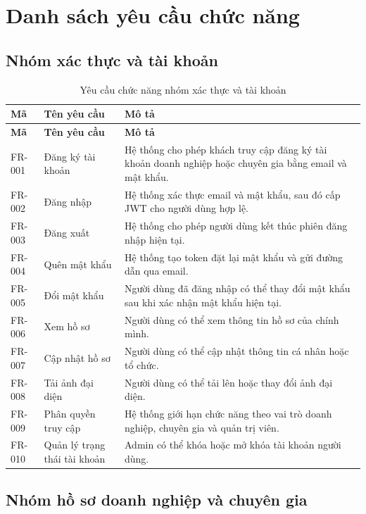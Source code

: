 \section{Danh sách yêu cầu chức năng}
\label{sec:functional-requirements-list}

\subsection{Nhóm xác thực và tài khoản}

\begin{longtable}{|p{2.0cm}|p{4.2cm}|p{7.6cm}|}
\caption{Yêu cầu chức năng nhóm xác thực và tài khoản}
\label{tab:fr-authentication} \\ \hline
\textbf{Mã} & \textbf{Tên yêu cầu} & \textbf{Mô tả} \\ \hline
\endfirsthead
\hline
\textbf{Mã} & \textbf{Tên yêu cầu} & \textbf{Mô tả} \\ \hline
\endhead

FR-001 & Đăng ký tài khoản & Hệ thống cho phép khách truy cập đăng ký tài khoản doanh nghiệp hoặc chuyên gia bằng email và mật khẩu. \\ \hline
FR-002 & Đăng nhập & Hệ thống xác thực email và mật khẩu, sau đó cấp JWT cho người dùng hợp lệ. \\ \hline
FR-003 & Đăng xuất & Hệ thống cho phép người dùng kết thúc phiên đăng nhập hiện tại. \\ \hline
FR-004 & Quên mật khẩu & Hệ thống tạo token đặt lại mật khẩu và gửi đường dẫn qua email. \\ \hline
FR-005 & Đổi mật khẩu & Người dùng đã đăng nhập có thể thay đổi mật khẩu sau khi xác nhận mật khẩu hiện tại. \\ \hline
FR-006 & Xem hồ sơ & Người dùng có thể xem thông tin hồ sơ của chính mình. \\ \hline
FR-007 & Cập nhật hồ sơ & Người dùng có thể cập nhật thông tin cá nhân hoặc tổ chức. \\ \hline
FR-008 & Tải ảnh đại diện & Người dùng có thể tải lên hoặc thay đổi ảnh đại diện. \\ \hline
FR-009 & Phân quyền truy cập & Hệ thống giới hạn chức năng theo vai trò doanh nghiệp, chuyên gia và quản trị viên. \\ \hline
FR-010 & Quản lý trạng thái tài khoản & Admin có thể khóa hoặc mở khóa tài khoản người dùng. \\ \hline
\end{longtable}

\subsection{Nhóm hồ sơ doanh nghiệp và chuyên gia}

